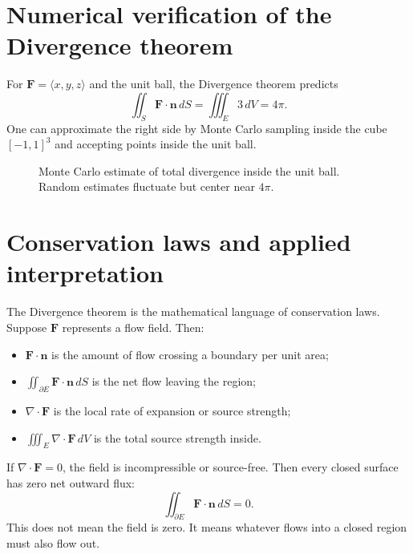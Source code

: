 \documentclass[11pt]{article}
\newcommand{\vn}{\mathbf n}
\newcommand{\vF}{\mathbf F}
\begin{document}
\section{Numerical verification of the Divergence theorem}

For $\vF=\langle x,y,z\rangle$ and the unit ball, the Divergence theorem predicts
\[
\iint_S\vF\cdot\vn\,dS=\iiint_E3\,dV=4\pi.
\]
One can approximate the right side by Monte Carlo sampling inside the cube $[-1,1]^3$ and accepting points inside the unit ball.

\begin{figure}[H]
\centering
{}
\caption{Monte Carlo estimate of total divergence inside the unit ball. Random estimates fluctuate but center near $4\pi$.}
\end{figure}

\section{Conservation laws and applied interpretation}

The Divergence theorem is the mathematical language of conservation laws. Suppose $\vF$ represents a flow field. Then:
\begin{itemize}
  \item $\vF\cdot\vn$ is the amount of flow crossing a boundary per unit area;
  \item $\iint_{\partial E}\vF\cdot\vn\,dS$ is the net flow leaving the region;
  \item $\nabla\cdot\vF$ is the local rate of expansion or source strength;
  \item $\iiint_E\nabla\cdot\vF\,dV$ is the total source strength inside.
\end{itemize}
If $\nabla\cdot\vF=0$, the field is incompressible or source-free. Then every closed surface has zero net outward flux:
\[
\iint_{\partial E}\vF\cdot\vn\,dS=0.
\]
This does not mean the field is zero. It means whatever flows into a closed region must also flow out.
\end{document}
